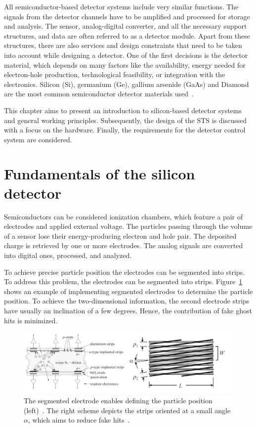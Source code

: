 
All semiconductor-based detector systems include very similar functions. The signals from the detector channels have to be amplified and processed for storage and analysis. The sensor, analog-digital converter, and all the necessary support structures, and data  are often referred to as a detector module. Apart from these structures, there are also services and design constraints that need to be taken into account while designing a detector. One of the first decisions is the detector material, which depends on many factors like the availability, energy needed for electron-hole production, technological feasibility, or integration with the electronics. Silicon (Si), germanium (Ge), gallium arsenide (GaAs) and Diamond are the most common semiconductor detector materials used~\cite{Lutz:1999wg,Hartmann:2017gzy}.


This chapter aims to present an introduction to silicon-based detector systems and general working principles. Subsequently, the design of the \gls{STS} is discussed with a focus on the hardware. Finally, the requirements for the detector control system are considered. 

\section{Fundamentals of the silicon detector}
Semiconductors can be considered ionization chambers, which feature a pair of electrodes and applied external voltage. The particles passing through the volume of a sensor lose their energy-producing electron and hole pair. The deposited charge is retrieved by one or more electrodes. The analog signals are converted into digital ones, processed, and analyzed.

To achieve precise particle position the electrodes can be segmented into strips. To address this problem, the electrodes can be segmented into strips. Figure~\ref{fig_si} shows an example of implementing segmented electrodes to determine the particle position. To achieve the two-dimensional information, the second electrode strips have usually an inclination of a few degrees. Hence, the contribution of fake ghost hits is minimized.  

\begin{figure}[!h]
\centering
\includegraphics[width=0.95\columnwidth]{Chapter2/images/silicons.png}
\caption{The segmented electrode enables defining the particle position (left)~\cite{Sokolov:2006vdx}. The right scheme depicts the strips oriented at a small angle $\alpha$, which aims to reduce fake hits~\cite{Spieler}.}
\label{fig_si}
\end{figure}
\newpage

